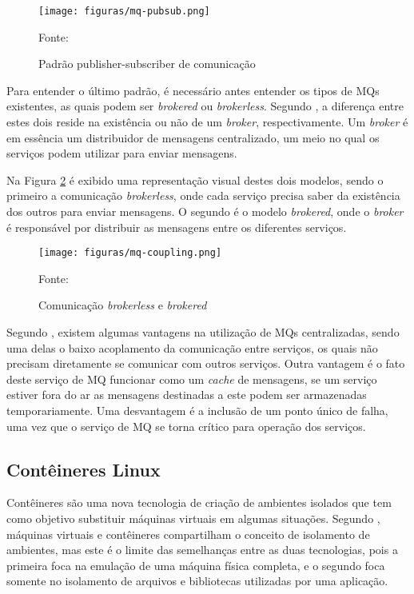 \begin{figure}[H]
	\centering
	\caption{Padrão publisher-subscriber de comunicação}
	\texttt{[image: figuras/mq-pubsub.png]}

	\label{fig:mq-pubsub}
	\footnotesize Fonte: 
\end{figure}

Para entender o último padrão, é necessário antes entender os tipos de \acp{MQ}
existentes, as quais podem ser \emph{brokered} ou \emph{brokerless}. Segundo
, a diferença entre estes dois reside na existência
ou não de um \emph{broker}, respectivamente. Um \emph{broker} é em essência um
distribuidor de mensagens centralizado, um meio no qual os serviços podem
utilizar para enviar mensagens.

Na Figura \ref{fig:mq-coupling} é exibido uma representação visual destes dois
modelos, sendo o primeiro a comunicação \emph{brokerless}, onde cada serviço
precisa saber da existência dos outros para enviar mensagens. O segundo é
o modelo \emph{brokered}, onde o \emph{broker} é responsável por distribuir
as mensagens entre os diferentes serviços.

\begin{figure}[H]
	\centering
	\caption{Comunicação \emph{brokerless} e \emph{brokered}}
	\texttt{[image: figuras/mq-coupling.png]}

	\label{fig:mq-coupling}
	\footnotesize Fonte: 
\end{figure}

Segundo , existem algumas vantagens na utilização
de \acp{MQ} centralizadas, sendo uma delas o baixo acoplamento da comunicação
entre serviços, os quais não precisam diretamente se comunicar com outros
serviços. Outra vantagem é o fato deste serviço de \ac{MQ} funcionar como
um \emph{cache} de mensagens, se um serviço estiver fora do ar as
mensagens destinadas a este podem ser armazenadas temporariamente. Uma
desvantagem é a inclusão de um ponto único de falha, uma vez que o serviço
de \ac{MQ} se torna crítico para operação dos serviços.

\subsection{Contêineres Linux}

Contêineres são uma nova tecnologia de criação de ambientes isolados que tem
como objetivo substituir máquinas virtuais em algumas situações. Segundo
, máquinas virtuais e contêineres compartilham o
conceito de isolamento de ambientes, mas este é o limite das semelhanças
entre as duas tecnologias, pois a primeira foca na emulação de uma máquina
física completa, e o segundo foca somente no isolamento de arquivos e
bibliotecas utilizadas por uma aplicação.

